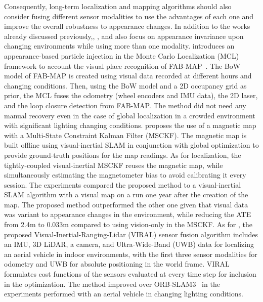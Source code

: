 Consequently, long-term localization and mapping algorithms should also consider fusing different sensor modalities to use the advantages of each one and improve the overall robustness to appearance changes. In addition to the works already discussed previously,\cite{pérez-et-al:2015:y}, \cite{coulin-et-al:2022:3136241}, and \cite{nguyen-et-al:2022:3094157} also focus on appearance invariance upon changing environments while using more than one modality.
\cite{pérez-et-al:2015:y} introduces an appearance-based particle injection in the Monte Carlo Localization (MCL) framework to account the visual place recognition of FAB-MAP~\parencite{discussion:fab-map}. The BoW model of FAB-MAP is created using visual data recorded at different hours and changing conditions. Then, using the BoW model and a 2D occupancy grid as prior, the MCL fuses the odometry (wheel encoders and IMU data), the 2D laser, and the loop closure detection from FAB-MAP. The method did not need any manual recovery even in the case of global localization in a crowded environment with significant lighting changing conditions.
\cite{coulin-et-al:2022:3136241} proposes the use of a magnetic map with a Multi-State Constraint Kalman Filter (MSCKF). The magnetic map is built offline using visual-inertial SLAM in conjunction with global optimization to provide ground-truth positions for the map readings. As for localization, the tightly-coupled visual-inertial MSCKF reuses the magnetic map, while simultaneously estimating the magnetometer bias to avoid calibrating it every session. The experiments compared the proposed method to a visual-inertial SLAM algorithm with a visual map on a run one year after the creation of the map. The proposed method outperformed the other one given that visual data was variant to appearance changes in the environment, while reducing the ATE from 2.4m to 0.033m compared to using vision-only in the MSCKF.
As for \cite{nguyen-et-al:2022:3094157}, the proposed Visual-Inertial-Ranging-Lidar (VIRAL) sensor fusion algorithm includes an IMU, 3D LiDAR, a camera, and Ultra-Wide-Band (UWB) data for localizing an aerial vehicle in indoor environments, with the first three sensor modalities for odometry and UWB for absolute positioning in the world frame. VIRAL formulates cost functions of the sensors evaluated at every time step for inclusion in the optimization. The method improved over ORB-SLAM3~\parencite{discussion:orb-slam3} in the experiments performed with an aerial vehicle in changing lighting conditions.





